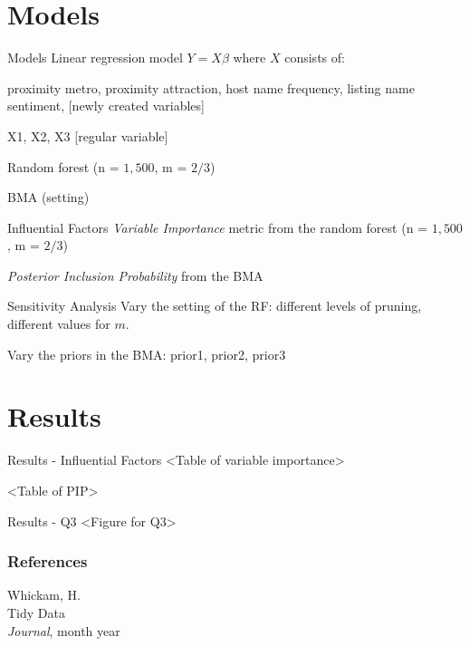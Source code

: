 \documentclass{beamer}
\begin{document}
\section{Models}
\begin{frame}{Models}
Linear regression model $Y = X \beta$
where $X$ consists of:

proximity metro, proximity attraction, host name frequency, listing name sentiment, [newly created variables]

X1, X2, X3 [regular variable]

Random forest (n = $1,500$, m = $2/3$)

BMA (setting)
\end{frame}

\begin{frame}{Influential Factors}
\textit{Variable Importance} metric from the random forest (n = $1,500$, m = $2/3$)

\textit{Posterior Inclusion Probability} from the BMA
\end{frame}

\begin{frame}{Sensitivity Analysis}
Vary the setting of the RF: different levels of pruning, different values for $m$.

Vary the priors in the BMA: prior1, prior2, prior3
\end{frame}


\section{Results}
\begin{frame}{Results - Influential Factors}
<Table of variable importance>

<Table of PIP>
\end{frame}


\begin{frame}{Results - Q3}
<Figure for Q3>
\end{frame}




\begin{frame}
\frametitle{References}
\footnotesize{
	\begin{thebibliography}{99} %
		
		 Whickam, H. \\
		\newblock Tidy Data\\
		\newblock \emph{Journal}, month year
		
	\end{thebibliography}
}
\end{frame}
\end{document}
